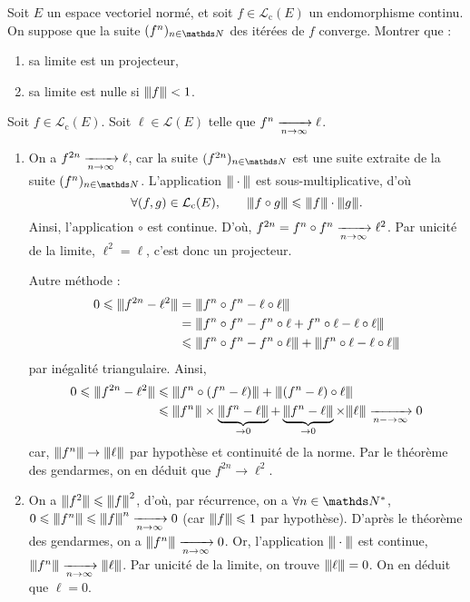 \begin{exo}
	\begin{slshape}
		Soit $E$ un espace vectoriel normé, et soit $f \in \mathcal{L}_\mathrm c(E)$ un endomorphisme continu.
		On suppose que la suite $(f^n)_{n\in\N}$ des itérées de $f$ converge. Montrer que :
		\begin{enumerate}
			\item sa limite est un projecteur,
			\item sa limite est nulle si $\sub f < 1$.
		\end{enumerate}
	\end{slshape}
	
	Soit $f \in \mathcal{L}_\mathrm{c}(E)$. Soit $\ell \in \mathcal{L}(E)$ telle que $f^n \xrightarrow[n\to\infty]{} \ell$.
	\begin{enumerate}
		\item On a $f^{2n} \xrightarrow[n\to\infty]{} \ell$, car la suite $(f^{2n})_{n\in\N}$ est une suite extraite de la suite $(f^n)_{n\in\N}$.
			L'application $\sub\cdot$ est sous-multiplicative, d'où \[
				\forall (f,g) \in \mathcal{L}_\mathrm{c}(E),\quad\quad \sub{f \circ g} \le \sub f \cdot \sub g.
			\] Ainsi, l'application $\circ$ est continue.
			D'où, $f^{2n} = f^n \circ f^n \xrightarrow[n\to\infty]{} \ell^2$. Par unicité de la limite, $\ell^2 = \ell$, c'est donc un projecteur.
			
			Autre méthode :
			\begin{align*}
				0\le \sub{f^{2n} - \ell^2} &= \sub{f^n \circ f^n - \ell\circ\ell}\\
				&= \sub{f^n \circ f^n - f^n \circ \ell + f^n \circ \ell - \ell \circ \ell}\\
				&\le \sub{f^n \circ f^n - f^n \circ \ell} + \sub{f^n \circ\ell - \ell \circ \ell}\\
			\end{align*}
			par inégalité triangulaire. Ainsi,
			\begin{align*}
				0 \le \sub{f^{2n} - \ell^2} &\le \sub{f^n \circ (f^n - \ell)} + \sub{(f^n - \ell) \circ \ell}\\
				&\le \sub{f^n} \times \underbrace{\sub{f^n - \ell}}_{\to 0} + \underbrace{\sub{f^n - \ell}}_{\to 0} \times \sub\ell \tendsto{n-\to \infty} 0
			\end{align*}
			car, $\sub{f^n} \to \sub\ell$ par hypothèse et continuité de la norme.
			Par le théorème des gendarmes, on en déduit que $f^{2n} \to \ell^2$.
		\item On a $\sub{f^2} \le \sub f^2$, d'où, par récurrence, on a $\forall n\in\N^*$, $0 \le \sub{f^n} \le \sub f^n \tendsto{n\to\infty} 0$ (car $\sub f \le 1$ par hypothèse).
			D'après le théorème des gendarmes, on a $\sub {f^n} \tendsto{n\to\infty} 0$.
			Or, l'application $\sub\cdot$ est continue, $\sub{f^n} \tendsto{n\to\infty} \sub\ell$.
			Par unicité de la limite, on trouve $\sub\ell = 0$. On en déduit que $\ell = 0$.
	\end{enumerate}
\end{exo}

